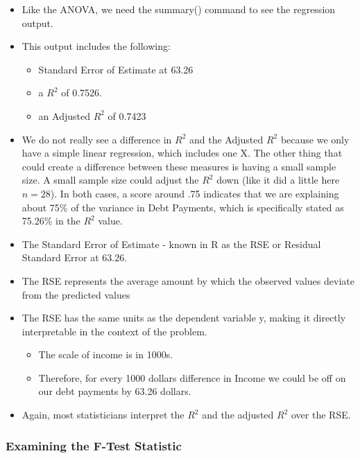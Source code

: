 \documentclass[
  letterpaper,
  DIV=11,
  numbers=noendperiod]{scrreprt}
\providecommand{\tightlist}{%
  \setlength{\itemsep}{0pt}\setlength{\parskip}{0pt}}\usepackage{longtable,booktabs,array}
\begin{document}
\begin{itemize}
\item
  Like the ANOVA, we need the summary() command to see the regression
  output.
\item
  This output includes the following:

  \begin{itemize}
  \tightlist
  \item
    Standard Error of Estimate at 63.26
  \item
    a \(R^2\) of 0.7526.
  \item
    an Adjusted \(R^2\) of 0.7423
  \end{itemize}
\item
  We do not really see a difference in \(R^2\) and the Adjusted \(R^2\)
  because we only have a simple linear regression, which includes one X.
  The other thing that could create a difference between these measures
  is having a small sample size. A small sample size could adjust the
  \(R^2\) down (like it did a little here \(n=28\)). In both cases, a
  score around .75 indicates that we are explaining about 75\% of the
  variance in Debt Payments, which is specifically stated as 75.26\% in
  the \(R^2\) value.
\item
  The Standard Error of Estimate - known in R as the RSE or Residual
  Standard Error at 63.26.
\item
  The RSE represents the average amount by which the observed values
  deviate from the predicted values
\item
  The RSE has the same units as the dependent variable y, making it
  directly interpretable in the context of the problem.

  \begin{itemize}
  \tightlist
  \item
    The scale of income is in 1000s.
  \item
    Therefore, for every 1000 dollars difference in Income we could be
    off on our debt payments by 63.26 dollars.
  \end{itemize}
\item
  Again, most statisticians interpret the \(R^2\) and the adjusted
  \(R^2\) over the RSE.
\end{itemize}

\subsubsection{Examining the F-Test
Statistic}\label{examining-the-f-test-statistic}
\end{document}
